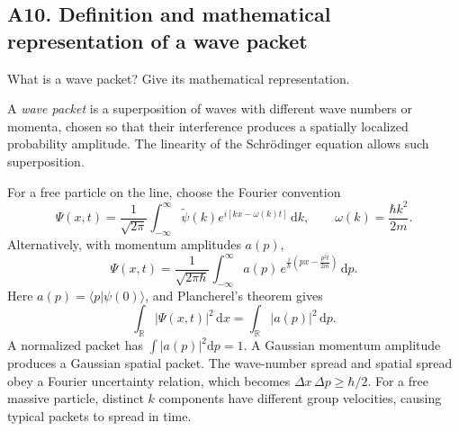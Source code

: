 \documentclass[11pt,a4paper]{article}
\newcommand{\dd}{\mathrm{d}}
\newcommand{\R}{\mathbb R}
\newcommand{\Sch}{Schr\"odinger}
\begin{document}
\subsection{A10. Definition and mathematical representation of a wave packet}
\begin{questionbox}What is a wave packet? Give its mathematical representation.\end{questionbox}
A \emph{wave packet} is a superposition of waves with different wave numbers or momenta, chosen so that their interference produces a spatially localized probability amplitude. The linearity of the \Sch{} equation allows such superposition.\par
For a free particle on the line, choose the Fourier convention
\begin{equation}
\boxed{\Psi(x,t)=\frac1{\sqrt{2\pi}}\int_{-\infty}^\infty
\widetilde\psi(k) e^{i[kx-\omega(k)t]}\,\dd k},\qquad
\omega(k)=\frac{\hbar k^2}{2m}.
\end{equation}
Alternatively, with momentum amplitudes $a(p)$,
\begin{equation}\label{eq:packet}
\boxed{\Psi(x,t)=\frac1{\sqrt{2\pi\hbar}}\int_{-\infty}^\infty
a(p)\,e^{\frac i\hbar(px-\frac{p^2t}{2m})}\,\dd p}.
\end{equation}
Here $a(p)=\langle p|\psi(0)\rangle$, and Plancherel's theorem gives
\begin{equation}
\int_{\R}|\Psi(x,t)|^2\,\dd x=\int_{\R}|a(p)|^2\,\dd p.
\end{equation}
A normalized packet has $\int|a(p)|^2\dd p=1$. A Gaussian momentum amplitude produces a Gaussian spatial packet. The wave-number spread and spatial spread obey a Fourier uncertainty relation, which becomes $\Delta x\,\Delta p\ge\hbar/2$. For a free massive particle, distinct $k$ components have different group velocities, causing typical packets to spread in time.
\end{document}
